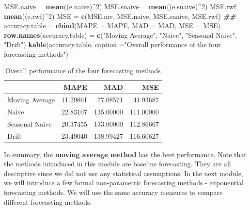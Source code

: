 \documentclass[
]{book}
\newenvironment{Shaded}{\begin{snugshade}}{\end{snugshade}}
\newcommand{\AttributeTok}[1]{\textcolor[rgb]{0.13,0.29,0.53}{#1}}
\newcommand{\DecValTok}[1]{\textcolor[rgb]{0.00,0.00,0.81}{#1}}
\newcommand{\DocumentationTok}[1]{\textcolor[rgb]{0.56,0.35,0.01}{\textbf{\textit{#1}}}}
\newcommand{\FunctionTok}[1]{\textcolor[rgb]{0.13,0.29,0.53}{\textbf{#1}}}
\newcommand{\NormalTok}[1]{#1}
\newcommand{\OtherTok}[1]{\textcolor[rgb]{0.56,0.35,0.01}{#1}}
\newcommand{\SpecialCharTok}[1]{\textcolor[rgb]{0.81,0.36,0.00}{\textbf{#1}}}
\newcommand{\StringTok}[1]{\textcolor[rgb]{0.31,0.60,0.02}{#1}}
\begin{document}
\begin{Shaded}
\begin{Highlighting}[]
\NormalTok{MSE.naive }\OtherTok{=} \FunctionTok{mean}\NormalTok{((e.naive)}\SpecialCharTok{\^{}}\DecValTok{2}\NormalTok{)}
\NormalTok{MSE.snaive }\OtherTok{=} \FunctionTok{mean}\NormalTok{((e.snaive)}\SpecialCharTok{\^{}}\DecValTok{2}\NormalTok{)}
\NormalTok{MSE.rwf }\OtherTok{=} \FunctionTok{mean}\NormalTok{((e.rwf)}\SpecialCharTok{\^{}}\DecValTok{2}\NormalTok{)}
\NormalTok{MSE }\OtherTok{=} \FunctionTok{c}\NormalTok{(MSE.mv, MSE.naive, MSE.snaive, MSE.rwf)}
\DocumentationTok{\#\#}
\NormalTok{accuracy.table }\OtherTok{=} \FunctionTok{cbind}\NormalTok{(}\AttributeTok{MAPE =}\NormalTok{ MAPE, }\AttributeTok{MAD =}\NormalTok{ MAD, }\AttributeTok{MSE =}\NormalTok{ MSE)}
\FunctionTok{row.names}\NormalTok{(accuracy.table) }\OtherTok{=} \FunctionTok{c}\NormalTok{(}\StringTok{"Moving Average"}\NormalTok{, }\StringTok{"Naive"}\NormalTok{, }\StringTok{"Seasonal Naive"}\NormalTok{, }\StringTok{"Drift"}\NormalTok{)}
\FunctionTok{kable}\NormalTok{(accuracy.table, }\AttributeTok{caption =}\StringTok{"Overall performance of the four forecasting methods"}\NormalTok{)}
\end{Highlighting}
\end{Shaded}

\begin{table}

\caption{\label{tab:unnamed-chunk-208}Overall performance of the four forecasting methods}
\centering
\begin{tabular}[t]{l|r|r|r}
\hline
  & MAPE & MAD & MSE\\
\hline
Moving Average & 11.29861 & 77.08571 & 41.93687\\
\hline
Naive & 22.83107 & 135.00000 & 111.00000\\
\hline
Seasonal Naive & 20.37455 & 133.00000 & 112.86667\\
\hline
Drift & 23.49040 & 138.99427 & 116.60627\\
\hline
\end{tabular}
\end{table}

In summary, the \textbf{moving average method} has the best performance. Note that the methods introduced in this module are baseline forecasting. They are all descriptive since we did not use any statistical assumptions. In the next module, we will introduce a few formal non-parametric forecasting methods - exponential forecasting methods. We will use the same accuracy measures to compare different forecasting methods.

\hfill\break
\end{document}
